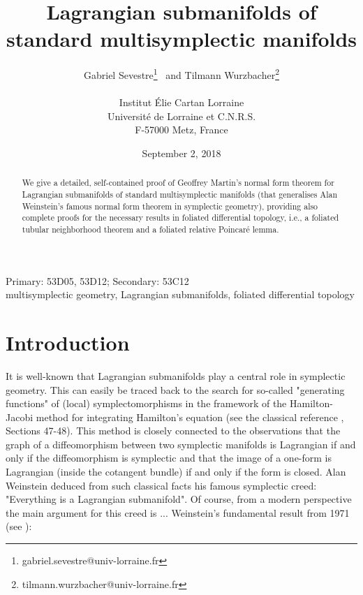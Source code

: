 \documentclass[a4paper,12pt,leqno]{article}
\begin{document}
\title{Lagrangian submanifolds of standard multisymplectic manifolds}
\author{Gabriel Sevestre\thanks{gabriel.sevestre@univ-lorraine.fr}~  
 and Tilmann Wurzbacher\thanks{tilmann.wurzbacher@univ-lorraine.fr}\\
\phantom{Higgs} \\
Institut \'Elie Cartan Lorraine \\
Universit\'{e} de Lorraine et C.N.R.S. \\
F-57000 Metz, France \\}




\date{September 2, 2018}


\maketitle

\begin{abstract}
We give a detailed, self-contained proof of Geoffrey Martin's normal form theorem for Lagrangian 
submanifolds of standard multisymplectic manifolds (that generalises Alan Weinstein's famous normal
form theorem in symplectic geometry), providing also complete proofs for the necessary results in
foliated differential topo\-logy, i.e., a foliated tubular neighborhood theorem and a foliated relative Poincar\'e lemma.
\end{abstract}


 Primary: 53D05, 53D12; Secondary: 53C12\\

 multisymplectic geometry, Lagrangian submanifolds, foliated differential topology




\section*{Introduction}


It is well-known that Lagrangian submanifolds play a central role in symplectic geometry. This can easily be traced back to the search 
for so-called "generating functions" of (local) symplectomorphisms in the framework of the Hamilton-Jacobi method for integrating 
Hamilton's equation (see the classical reference \cite{arno}, Sections 47-48). 
This method is closely connected to the observations 
that the graph of a diffeomorphism between two symplectic manifolds 
is Lagrangian if and only if the diffeomorphism is symplectic and that the image of a one-form is Lagrangian (inside the cotangent bundle) if and
only if the form is closed. Alan Weinstein deduced from such classical facts his famous symplectic creed: "Everything is a Lagrangian submanifold".
Of course, from a modern perspective the main argument for this creed is ... Weinstein's fundamental result from 1971 (see \cite{weinlag}):\\
\end{document}
